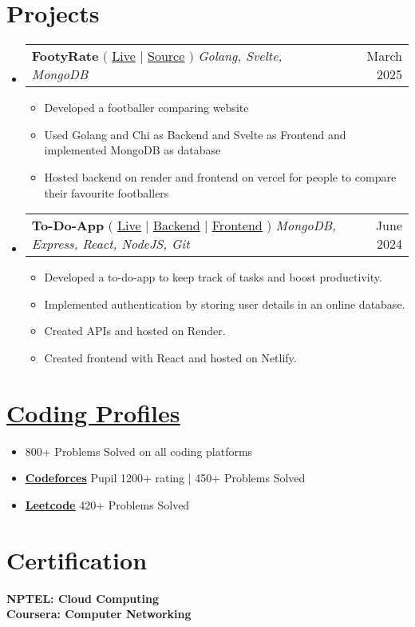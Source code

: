 \documentclass[letterpaper,11pt]{article}
\makeatletter
\newcommand{\resumeItem}[1]{
  \item\small{
    {#1 \vspace{-2pt}}
  }
}
\newcommand{\resumeProjectHeading}[2]{
    \item
    \begin{tabular*}{0.97\textwidth}{l@{\extracolsep{\fill}}r}
      \small#1 & #2 \\
    \end{tabular*}\vspace{-7pt}
}
\newcommand{\resumeSubHeadingListStart}{\begin{itemize}[leftmargin=0.15in, label={}]}
\newcommand{\resumeSubHeadingListEnd}{\end{itemize}}
\newcommand{\resumeItemListStart}{\begin{itemize}}
\newcommand{\resumeItemListEnd}{\end{itemize}\vspace{-5pt}}
\makeatother
\begin{document}
\section{Projects}
    \resumeSubHeadingListStart
      \resumeProjectHeading
          {\textbf{FootyRate} $($
          {\href{https://footyrate.vercel.app/}{\underline{Live}}} $|$ 
          {\href{https://github.com/RunAtTekky/footyrate}{\underline{Source}}} $)$ \emph{Golang, Svelte, MongoDB}}{March 2025}
          \resumeItemListStart
            \resumeItem{Developed a footballer comparing website}
            \resumeItem{Used Golang and Chi as Backend and Svelte as Frontend and implemented MongoDB as database}
            \resumeItem{Hosted backend on render and frontend on vercel for people to compare their favourite footballers}
          \resumeItemListEnd
      \resumeProjectHeading
          {\textbf{To-Do-App} $($
          {\href{https://kaamkarbhai.netlify.app/}{\underline{Live}}} $|$ 
          {\href{https://github.com/RunAtTekky/to-do-app}{\underline{Backend}}} $|$
          {\href{https://github.com/RunAtTekky/react-to-do-app}{\underline{Frontend}}} $)$ \emph{ MongoDB, Express,  React, NodeJS, Git}}{June 2024}
          \resumeItemListStart
            \resumeItem{Developed a to-do-app to keep track of tasks and boost productivity.}
            \resumeItem{Implemented authentication by storing user details in an online database.}
            \resumeItem{Created APIs and hosted on Render.}
            \resumeItem{Created frontend with React and hosted on Netlify.}
          \resumeItemListEnd
    \resumeSubHeadingListEnd

\section{\href{https://codolio.com/profile/runat}{\underline{Coding Profiles}}}
    \resumeItemListStart
        \resumeItem{800+ Problems Solved on all coding platforms}
        \resumeItem{{\textbf{\href{https://codeforces.com/profile/RunAt}{\underline{Codeforces}}}} Pupil 1200+ rating | 450+ Problems Solved}
    
        \resumeItem{{\textbf{\href{https://leetcode.com/RunAtMe/}{\underline{Leetcode}}}} 420+ Problems Solved}
    \resumeItemListEnd

%
\section{Certification}
 \begin{itemize}[leftmargin=0.15in, label={}]
    \small{\item{
     \textbf{NPTEL: Cloud Computing} \\
     \textbf{Coursera: Computer Networking}
    }}
 \end{itemize}
%
\end{document}
